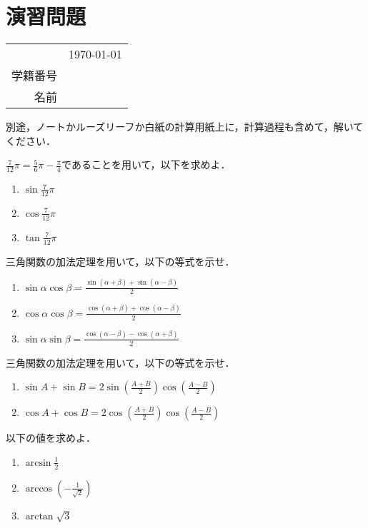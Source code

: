 \section*{演習問題}
\begin{table}[!t]
	\begin{flushright}
		\begin{tabular}{rc}
			& \usdate\today \\
			学籍番号 & \\
			名前 & \\
		\end{tabular}
	\end{flushright}
\end{table}
別途，ノートかルーズリーフか白紙の計算用紙上に，計算過程も含めて，解いてください．

\begin{question}
	$\displaystyle \frac{7}{12}\pi = \frac{5}{6}\pi - \frac{\pi}{4}$であることを用いて，以下を求めよ．
	\begin{enumerate}[itemsep=2ex, label*=(\arabic*)]
		\item $\displaystyle \sin\frac{7}{12}\pi$
		\item $\displaystyle \cos\frac{7}{12}\pi$
		\item $\displaystyle \tan\frac{7}{12}\pi$
	\end{enumerate}
\end{question}

\begin{question}
	三角関数の加法定理を用いて，以下の等式を示せ．
	\begin{enumerate}[itemsep=2ex, label*=(\arabic*)]
		\item $\displaystyle \sin\alpha\cos\beta = \frac{\sin(\alpha+\beta) + \sin(\alpha-\beta)}{2}$
		\item $\displaystyle \cos\alpha\cos\beta = \frac{\cos(\alpha+\beta) + \cos(\alpha-\beta)}{2}$
		\item $\displaystyle \sin\alpha\sin\beta = \frac{\cos(\alpha-\beta) - \cos(\alpha+\beta)}{2}$
	\end{enumerate}
\end{question}

\begin{question}
	三角関数の加法定理を用いて，以下の等式を示せ．
	\begin{enumerate}[itemsep=2ex, label*=(\arabic*)]
		\item $\displaystyle \sin A + \sin B = 2\sin\left(\frac{A+B}{2}\right)\cos\left(\frac{A-B}{2}\right)$
		\item $\displaystyle \cos A + \cos B = 2\cos\left(\frac{A+B}{2}\right)\cos\left(\frac{A-B}{2}\right)$
	\end{enumerate}
\end{question}

\begin{question}
	以下の値を求めよ．
	\begin{enumerate}[itemsep=2ex, label*=(\arabic*)]
		\item $\displaystyle \arcsin\frac{1}{2}$
		\item $\displaystyle \arccos\left(-\frac{1}{\sqrt{2}}\right)$
		\item $\displaystyle \arctan\sqrt{3}$
	\end{enumerate}
\end{question}
